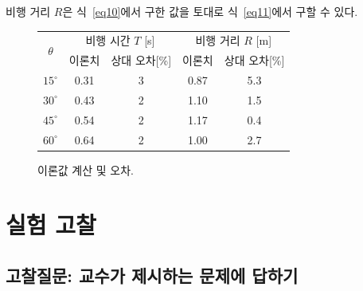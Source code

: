\documentclass[12pt,a4paper]{article}
\begin{document}
비행 거리 $R$은 식~\ref{eq10}에서 구한 값을 토대로 식~\ref{eq11}에서 구할 수 있다.
\begin{figure}[hbt!]
    \centering
    \begin{tabular}{|c|c|c|c|c|}
        \hline
        \multirow{2}{*}{$\theta$} & \multicolumn{2}{c|}{비행 시간 $T$ [s]} & \multicolumn{2}{c|}{비행 거리 $R$ [m]} \\
        \cline{2-5}
        & 이론치 & 상대 오차[\%] & 이론치 & 상대 오차[\%] \\
        \hline
        $15^{\circ}$ & 0.31 & 3 & 0.87 & 5.3 \\
        \hline
        $30^{\circ}$ & 0.43 & 2 & 1.10 & 1.5 \\
        \hline
        $45^{\circ}$ & 0.54 & 2 & 1.17 & 0.4 \\
        \hline
        $60^{\circ}$ & 0.64 & 2 & 1.00 & 2.7 \\
        \hline
    \end{tabular}
    \caption{\label{fig10} 이론값 계산 및 오차.}
\end{figure}
\section{실험 고찰}
    \subsection{고찰질문: 교수가 제시하는 문제에 답하기}
\end{document}
